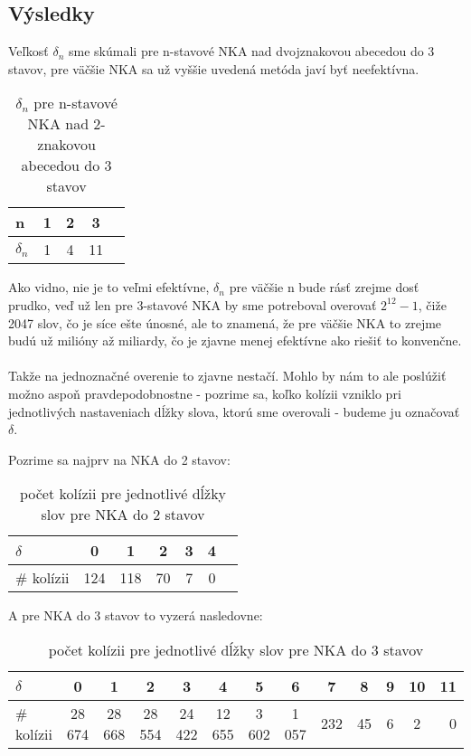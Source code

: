 \subsection{Výsledky}

Veľkosť $\delta_n$ sme skúmali pre n-stavové NKA nad dvojznakovou abecedou do 3 stavov, pre väčšie NKA sa už vyššie uvedená metóda javí byť neefektívna.

\begin{table}[h]
  \centering
  \begin{tabular}{|l|c|c|c|r|}
    \hline
    n & 1 & 2 & 3 \\ 
    \hline
    $\delta_n$ & 1 & 4 & 11 \\ 
    \hline
  \end{tabular}
  \caption{$\delta_n$ pre n-stavové  NKA nad 2-znakovou abecedou do 3 stavov}
\end{table}

Ako vidno, nie je to veľmi efektívne, $\delta_n$ pre väčšie n bude rásť zrejme dosť prudko, veď už len pre 3-stavové NKA by sme potreboval overovať $2^12 - 1$, čiže 2047 slov, čo je síce ešte únosné, ale to znamená, že pre väčšie NKA to zrejme budú už milióny až miliardy, čo je zjavne menej efektívne ako riešiť to konvenčne.
\paragraph{}
Takže na jednoznačné overenie to zjavne nestačí. Mohlo by nám to ale poslúžiť možno aspoň pravdepodobnostne - pozrime sa, koľko kolízii vzniklo pri jednotlivých nastaveniach dĺžky slova, ktorú sme overovali - budeme ju označovať $\delta$.

Pozrime sa najprv na NKA do 2 stavov:
\begin{table}[h]
  \centering
  \begin{tabular}{|l|c|c|c|c|c|r|}
    \hline
    $\delta$ & 0 & 1 & 2 & 3 & 4 \\ 
    \hline
    \# kolízii & 124 & 118 & 70 & 7 & 0 \\
    \hline
  \end{tabular}
  \caption{počet kolízii pre jednotlivé dĺžky slov pre NKA do 2 stavov}
\end{table}

A pre NKA do 3 stavov to vyzerá nasledovne:
\begin{table}[h]
  \centering
  \begin{tabular}{|l|c|c|c|c|c|c|c|c|c|c|c|r|}
    \hline
    $\delta$ & 0 & 1 & 2 & 3 & 4 & 5 & 6 & 7 & 8 & 9 & 10 & 11 \\ 
    \hline
    \# kolízii & 28 674 & 28 668 & 28 554 & 24 422 & 12 655 & 3 602 & 1 057 & 232 & 45 & 6 & 2 & 0\\ 
    \hline
  \end{tabular}
  \caption{počet kolízii pre jednotlivé dĺžky slov pre NKA do 3 stavov}
\end{table}


